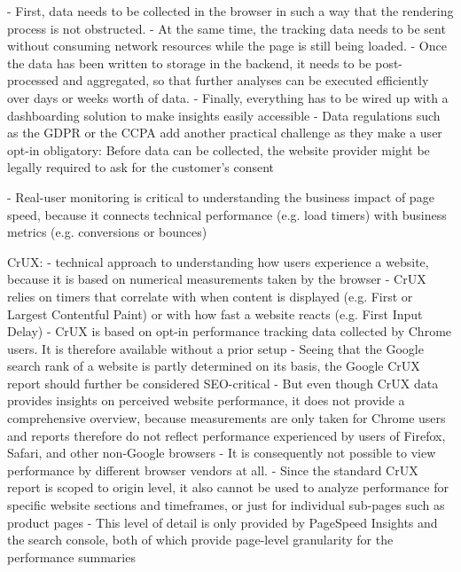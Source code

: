 - First, data needs to be collected in the browser in such a way that the rendering process is not obstructed. 
- At the same time, the tracking data needs to be sent without consuming network resources while the page is still being loaded. 
- Once the data has been written to storage in the backend, it needs to be post-processed and aggregated, so that further analyses can be executed efficiently over days or weeks worth of data. 
- Finally, everything has to be wired up with a dashboarding solution to make insights easily accessible
- Data regulations such as the GDPR or the CCPA add another practical challenge as they make a user opt-in obligatory: Before data can be collected, the website provider might be legally required to ask for the customer’s consent

- Real-user monitoring is critical to understanding the business impact of page speed, because it connects technical performance (e.g. load timers) with business metrics (e.g. conversions or bounces)


CrUX:
- technical approach to understanding how users experience a website, because it is based on numerical measurements taken by the browser
- CrUX relies on timers that correlate with when content is displayed (e.g. First or Largest Contentful Paint) or with how fast a website reacts (e.g. First Input Delay)
- CrUX is based on opt-in performance tracking data collected by Chrome users. It is therefore available without a prior setup
-  Seeing that the Google search rank of a website is partly determined on its basis, the Google CrUX report should further be considered SEO-critical
- But even though CrUX data provides insights on perceived website performance, it does not provide a comprehensive overview, because measurements are only taken for Chrome users and reports therefore do not reflect performance experienced by users of Firefox, Safari, and other non-Google browsers
- It is consequently not possible to view performance by different browser vendors at all.
- Since the standard CrUX report is scoped to origin level, it also cannot be used to analyze performance for specific website sections and timeframes, or just for individual sub-pages such as product pages
- This level of detail is only provided by PageSpeed Insights and the search console, both of which provide page-level granularity for the performance summaries











